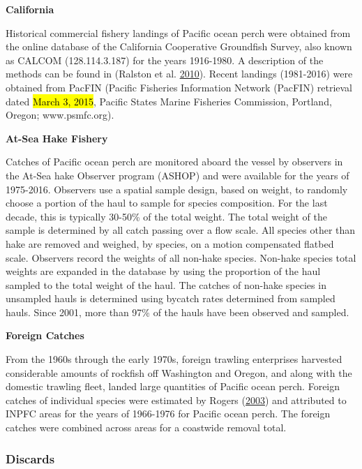 \documentclass[12pt,]{article}
\begin{document}
\textbf{California}

Historical commercial fishery landings of Pacific ocean perch were
obtained from the online database of the California Cooperative
Groundfish Survey, also known as CALCOM (128.114.3.187) for the years
1916-1980. A description of the methods can be found in (Ralston et al.
\protect\hyperlink{ref-ralston_documentation_2010}{2010}). Recent
landings (1981-2016) were obtained from PacFIN (Pacific Fisheries
Information Network (PacFIN) retrieval dated \hl{March 3, 2015}, Pacific
States Marine Fisheries Commission, Portland, Oregon; www.psmfc.org).

\textbf{At-Sea Hake Fishery}

Catches of Pacific ocean perch are monitored aboard the vessel by
observers in the At-Sea hake Observer program (ASHOP) and were available
for the years of 1975-2016. Observers use a spatial sample design, based
on weight, to randomly choose a portion of the haul to sample for
species composition. For the last decade, this is typically 30-50\% of
the total weight. The total weight of the sample is determined by all
catch passing over a flow scale. All species other than hake are removed
and weighed, by species, on a motion compensated flatbed scale.
Observers record the weights of all non-hake species. Non-hake species
total weights are expanded in the database by using the proportion of
the haul sampled to the total weight of the haul. The catches of
non-hake species in unsampled hauls is determined using bycatch rates
determined from sampled hauls. Since 2001, more than 97\% of the hauls
have been observed and sampled.

\textbf{Foreign Catches}

From the 1960s through the early 1970s, foreign trawling enterprises
harvested considerable amounts of rockfish off Washington and Oregon,
and along with the domestic trawling fleet, landed large quantities of
Pacific ocean perch. Foreign catches of individual species were
estimated by Rogers (\protect\hyperlink{ref-rogers_species_2003}{2003})
and attributed to INPFC areas for the years of 1966-1976 for Pacific
ocean perch. The foreign catches were combined across areas for a
coastwide removal total.

\subsubsection{Discards}\label{discards}
\end{document}
